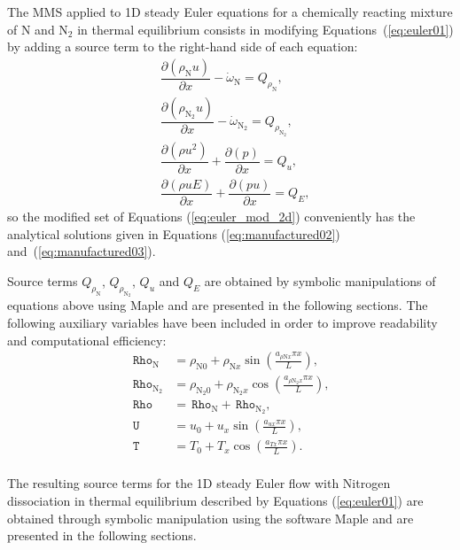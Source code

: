 \documentclass[10pt]{article}
\newcommand{\Diff}[2] {\dfrac{\partial( #1)}{\partial #2}}
\newcommand{\Rho}{\,\mathtt{Rho}}
\newcommand{\T}{\,\mathtt{T}}
\newcommand{\U}{\,\mathtt{U}}
\begin{document}



The MMS applied to 1D steady Euler equations for a chemically reacting mixture of  N and N$_{2}$ in thermal equilibrium consists in modifying  Equations~(\ref{eq:euler01}) by adding a source term to the right-hand side of each equation:
\begin{equation}
 \label{eq:euler_mod_2d}
\begin{split}
&\Diff{\rho_{\text{N}} u}{x} -\dot{\omega}_{\text{N}}= Q_{\rho_{\text{N}}},\\
&\Diff{\rho_{\text{N}_2} u}{x} -\dot{\omega}_{\text{N}_2}= Q_{\rho_{\text{N}_2}},\\
&\Diff{\rho u^2 }{x}+ \Diff{p}{x} = Q_u,\\
&\Diff{\rho uE}{x}+ \Diff{pu}{x} = Q_{E},
\end{split}
\end{equation}
%
so the modified set of Equations (\ref{eq:euler_mod_2d}) conveniently has the analytical solutions given in Equations (\ref{eq:manufactured02}) and~(\ref{eq:manufactured03}).
%

Source terms $ Q_{\rho_{\text{N}}}$, $ Q_{\rho_{\text{N}_2}}$, $Q_u$ and $Q_{E}$ are obtained by symbolic manipulations of equations above using Maple and are presented in the following sections. The following auxiliary variables have been included in order to improve readability and computational efficiency:
\begin{equation}
 \begin{split}
\label{eq:aux_1d}
\Rho_{\text{N}} &= \rho_{\text{N}0} + \rho_{\text{N}x} \sin\left(\frac{a_{  \rho \text{N} x }\pi x}{L}\right),\\
\Rho_{\text{N}_2} &= \rho_{\text{N}_2 0}+ \rho_{\text{N}_2 x} \cos\left(\frac{a_{ \rho \text{N}_2 x } \pi x}{L}\right),\\
\Rho&=\Rho_{\text{N}}+\Rho_{\text{N}_2},\\
\U &= u_{0}+u_{x} \sin\left(\frac{a_{u x} \pi x}{L}\right),\\
\T &= T_{0}+T_{x} \cos\left(\frac{a_{T x} \pi x}{L}\right).\\
\end{split}
\end{equation}

The resulting source terms for the 1D steady Euler flow with Nitrogen dissociation in thermal equilibrium described by Equations (\ref{eq:euler01}) are obtained through symbolic manipulation using the software Maple and are presented in the following sections.
\end{document}
